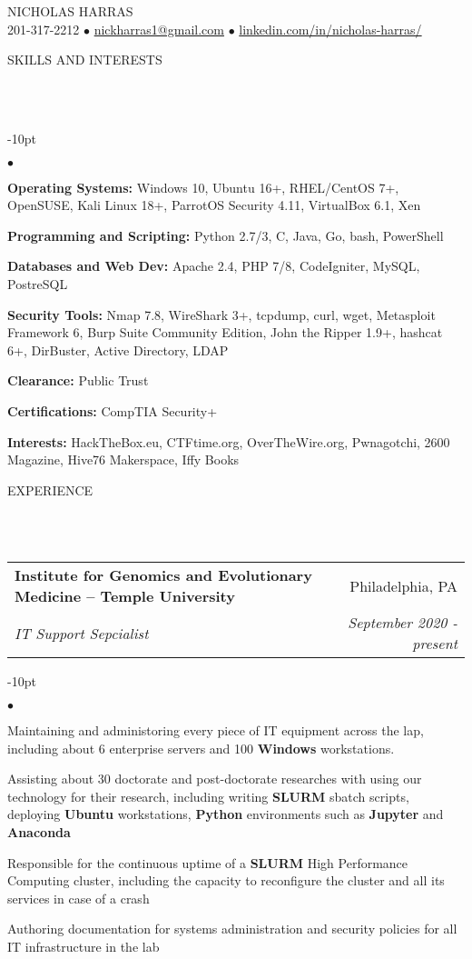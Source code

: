 \documentclass[12pt]{article}
\makeatletter
\newcommand{\mailto}[1]{
	\href{mailto:#1}{#1}
}
\newcommand{\contact}[2]{
	\vspace*{-8pt}
	\begin{center}
		{#1}\\ %
		#2
	\end{center}
	\vspace*{-12pt}
}
\newcommand{\header}[1]{
	\vspace*{12pt} %
	{\hspace*{-14pt}\vspace*{6pt} #1}
	\vspace*{-6pt} 
	\lineunder
}
\newcommand{\lineunder}{
	\vspace*{-8pt} \\ 
	\hspace*{-18pt} 
	\hrulefill \\
}
\newcommand{\subheading}[4]{
 	\vspace{5pt}
    	\begin{tabular*}{1.01\textwidth}
    		{l@{\extracolsep{\fill}}r}
      		\hspace{-16pt}\textbf{#1} & #2 \\
      		\hspace{-16pt}\textit{\small#3} & \textit{\small #4} \\
    	\end{tabular*}
    \vspace{-4pt}
}
\newenvironment{achievements}{
\begin{adjustwidth}{-10pt}{}
  \begin{list}{$\bullet$}{
  	\topsep 0pt \itemsep -4pt}}
  	{\vspace*{2pt}\end{list}
\end{adjustwidth}
}
\makeatother
\begin{document}
\small
\smallskip
\vspace*{-40pt}

\contact{\huge{N}\LARGE{ICHOLAS} \huge{H}\LARGE{ARRAS}}{201-317-2212 $\bullet$ \mailto{nickharras1@gmail.com} $\bullet$ \href{https://www.github.com/harras}{linkedin.com/in/nicholas-harras/}}


\vspace{-8pt}
\header{SKILLS AND INTERESTS}
	\begin{achievements}
		\item{\bf Operating Systems:} Windows 10, Ubuntu 16+, RHEL/CentOS 7+, OpenSUSE, Kali Linux 18+, ParrotOS Security 4.11, VirtualBox 6.1, Xen
		\item{\bf Programming and Scripting:} Python 2.7/3, C, Java, Go, bash, PowerShell
		\item{\bf Databases and Web Dev:} Apache 2.4, PHP 7/8, CodeIgniter, MySQL, PostreSQL
		\item{\bf Security Tools:} Nmap 7.8, WireShark 3+, tcpdump, curl, wget, Metasploit Framework 6, Burp Suite Community Edition, John the Ripper 1.9+, hashcat 6+, DirBuster, Active Directory, LDAP
		\item{\bf Clearance:} Public Trust
		\item{\bf Certifications:} CompTIA Security+
		\item{\bf Interests:} HackTheBox.eu, CTFtime.org, OverTheWire.org, Pwnagotchi, 2600 Magazine, Hive76 Makerspace, Iffy Books
	\end{achievements}

\vspace{-8pt}
\header{EXPERIENCE}

\subheading
	{Institute for Genomics and Evolutionary Medicine -- Temple University}{Philadelphia, PA}
	{IT Support Sepcialist}{September 2020 - present}
	\begin{achievements}
		\item Maintaining and administoring every piece of IT equipment across the lap, including about 6 enterprise servers and 100 \textbf{Windows} workstations. 
		\item Assisting about 30 doctorate and post-doctorate researches with using our technology for their research, including writing \textbf{SLURM} sbatch scripts, deploying \textbf{Ubuntu} workstations, \textbf{Python} environments such as \textbf{Jupyter} and \textbf{Anaconda}
		\item Responsible for the continuous uptime of a \textbf{SLURM} High Performance Computing cluster, including the capacity to reconfigure the cluster and all its services in case of a crash
		\item Authoring documentation for systems administration and security policies for all IT infrastructure in the lab
	\end{achievements}
\end{document}
